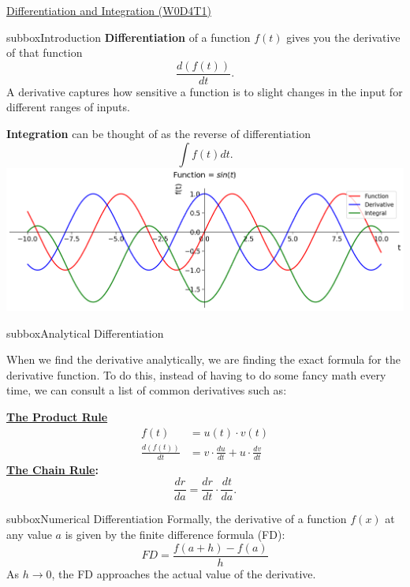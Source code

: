 \clearpage
\begin{textbox}{\href{https://compneuro.neuromatch.io/tutorials/W0D4_Calculus/student/W0D4_Tutorial1.html}{Differentiation and Integration (W0D4T1)}  }
\begin{subbox}{subbox}{Introduction}
\scriptsize
\textbf{Differentiation} of a function $f(t)$ gives you the derivative of that function \begin{equation} \frac{d(f(t))}{dt}.
\end{equation} A derivative captures how sensitive a function is to slight changes in the input for different ranges of inputs. 

\textbf{Integration} can be thought of as the reverse of differentiation
\begin{equation}
\int f(t)dt.
\end{equation}
\centering
\includegraphics[scale=0.15]{Figures/PreCourse/CFigure1.png}
\end{subbox}

\begin{subbox}{subbox}{Analytical Differentiation}
\scriptsize{
When we find the derivative analytically, we are finding the exact formula for the derivative function. 
To do this, instead of having to do some fancy math every time, we can consult a list of common derivatives such as:

\textbf{ \href{https://en.wikipedia.org/wiki/Product_rule}{The Product Rule}}
\begin{align}
f(t) &= u(t)\cdot v(t) \\
\frac{d(f(t))}{dt} &= v\cdot \frac{du}{dt} + u\cdot \frac{dv}{dt}
\end{align}
\textbf{\href{https://en.wikipedia.org/wiki/Chain_rule}{The Chain Rule}:}
\begin{equation}
\frac{dr}{da} = \frac{dr}{dt}\cdot\frac{dt}{da}.
\end{equation}
}
\end{subbox}
\begin{subbox}{subbox}{Numerical Differentiation}
\scriptsize{Formally, the derivative of a function $f(x)$ at any value $a$ is given by the finite difference formula (FD): 
\begin{equation}
FD = \frac{f(a+h) - f(a)}{h}
\end{equation}
As $h\rightarrow 0$, the FD approaches the actual value of the derivative.}


\end{subbox}
\end{textbox}
